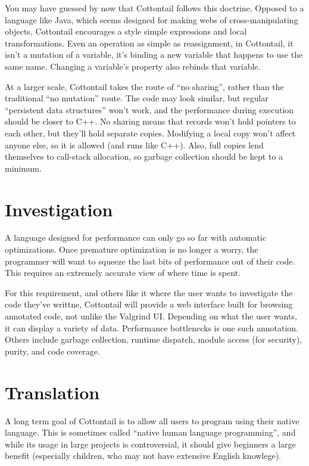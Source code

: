 You may have guessed by now that Cottontail follows this doctrine.
Opposed to a language like Java, which seems designed for making webs
of cross-manipulating objects, Cottontail encourages a style simple
expressions and local transformations. Even an operation as simple as
reassignment, in Cottontail, it isn't a mutation of a variable, it's
binding a new variable that happens to use the same name. Changing a
variable's property also rebinds that variable.

At a larger scale, Cottontail takes the route of ``no sharing'',
rather than the traditional ``no mutation'' route. The code may look
similar, but regular ``persistent data structures'' won't work, and
the performance during execution should be closer to C++. No sharing
means that records won't hold pointers to each other, but they'll hold
separate copies. Modifying a local copy won't affect anyone else, so
it is allowed (and runs like C++). Also, full copies lend themselves
to call-stack allocation, so garbage collection should be kept to a
minimum.


\section{Investigation}

A language designed for performance can only go so far with automatic
optimizations. Once premature optimization is no longer a worry, the
programmer will want to squeeze the last bits of performance out of
their code. This requires an extremely accurate view of where time is
spent.

For this requirement, and others like it where the user wants to
investigate the code they've writtne, Cottontail will provide a web
interface built for browsing annotated code, not unlike the Valgrind
UI. Depending on what the user wants, it can display a variety of
data. Performance bottlenecks is one such annotation. Others include
garbage collection, runtime dispatch, module access (for security),
purity, and code coverage.


\section{Translation}

A long term goal of Cottontail is to allow all users to program using
their native language. This is sometimes called ``native human
language programming'', and while its usage in large projects is
controversial, it should give beginners a large benefit (especially
children, who may not have extensive English knowlege).

